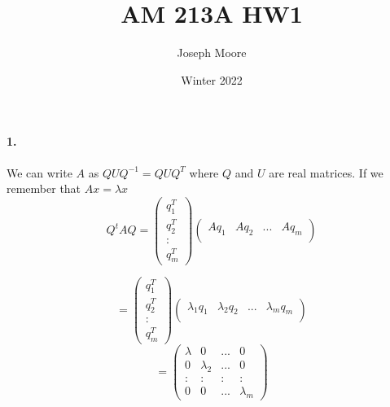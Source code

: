\documentclass[12pt]{article}
\title{AM 213A HW1}
\author{Joseph Moore}
\date{Winter 2022}
\begin{document}
\maketitle

\paragraph{1.}
    We can write $A$ as $QUQ^{-1} = QUQ^T$ where $Q$ and $U$ are real matrices. If we remember that $Ax = \lambda x$ 
    \[
    Q^tAQ = 
    \left(\begin{matrix}
    q_1^T \\
    q_2^T \\ 
    : \\ 
    q_m^T
    \end{matrix}\right)
    \left(\begin{matrix}
    Aq_1 & Aq_2 & ... & Aq_m \\
    \end{matrix}\right)
    \]
    
    \[
    = 
    \left(\begin{matrix}
    q_1^T \\
    q_2^T \\ 
    : \\ 
    q_m^T
    \end{matrix}\right)
    \left(\begin{matrix}
    \lambda_1 q_1 & \lambda_2q_2 & ... & \lambda_mq_m \\
    \end{matrix}\right)
    \]
    \[
    = 
    \left(\begin{matrix}
    \lambda & 0 & ... & 0 \\
    0 & \lambda_2 & ... & 0 \\
    : & : & :& : \\
    0 & 0 & ... & \lambda_m
    \end{matrix}\right)
    \]
    
\end{document}
